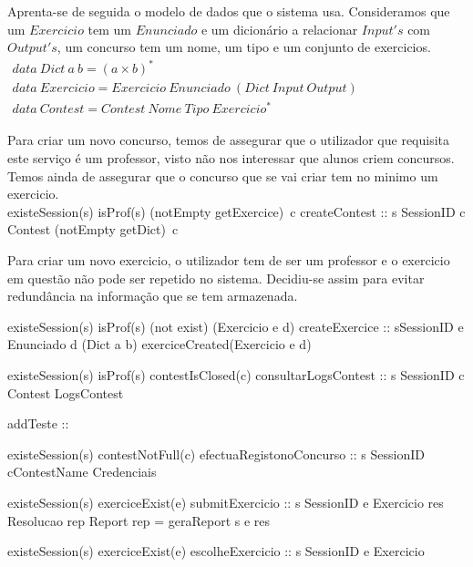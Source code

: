 Aprenta-se de seguida o modelo de dados que o sistema usa. Consideramos que um $Exercicio$ tem um $Enunciado$ e um dicionário a relacionar $Input's$ com $Output's$,
um concurso tem um nome, um tipo e um conjunto de exercicios.\\

$\begin{array}{l}
data~Dict~a~b = (a \times b)^{*} \\
data~Exercicio = Exercicio~Enunciado~(Dict~Input~Output) \\
data~Contest =  Contest~Nome~Tipo~Exercicio^{*}
\end{array}$

Para criar um novo concurso, temos de assegurar que o utilizador que requisita este serviço é um professor, visto não nos interessar que alunos criem concursos.
Temos ainda de assegurar que o concurso que se vai criar tem no minimo um exercicio.\\

\prop
{ existeSession(s)  \wedge isProf(s) \wedge (notEmpty \circ getExercice)~c}
{createContest :: s \unif SessionID \rarrow c \unif Contest }
{ (notEmpty \circ getDict)~c }

Para criar um novo exercicio, o utilizador tem de ser um professor e o exercicio em questão não pode ser repetido no sistema. Decidiu-se assim para evitar redundância
na informação que se tem armazenada.

\prop
{ existeSession(s)  \wedge isProf(s) \wedge (not \circ exist) (Exercicio e d)}
{createExercice :: s\unif SessionID \rarrow e \unif Enunciado \rarrow d \unif (Dict a b) }
{ exerciceCreated(Exercicio e d) }

\prop 
{ existeSession(s) \wedge isProf(s) \wedge contestIsClosed(c) }
{consultarLogsContest :: s \unif SessionID \rarrow c \unif Contest \rarrow LogsContest}
{}

\prop
{}
{addTeste :: }
{}

\prop
{ existeSession(s) \wedge contestNotFull(c)}
{efectuaRegistonoConcurso :: s \unif SessionID \rarrow c\unif ContestName \rarrow Credenciais}
{ }

\prop
{ existeSession(s) \wedge exerciceExist(e) }
{submitExercicio :: s \unif SessionID \rarrow e \unif Exercicio \rarrow res \unif Resolucao \rarrow rep \unif Report}
{ rep = geraReport s e res }

\prop
{ existeSession(s) \wedge exerciceExist(e) }
{escolheExercicio :: s \unif SessionID \rarrow e \unif Exercicio }
{ }

